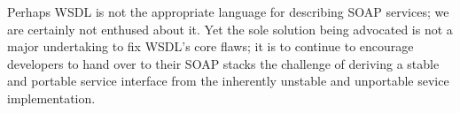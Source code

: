 Perhaps WSDL is not the appropriate language for
describing SOAP services; we are certainly not enthused about it. Yet
the sole solution being advocated is not a major undertaking to fix
WSDL's core flaws; it is to continue to encourage developers to hand
over to their SOAP stacks the challenge of deriving a stable and portable 
service interface from the inherently unstable and unportable sevice
implementation.   







